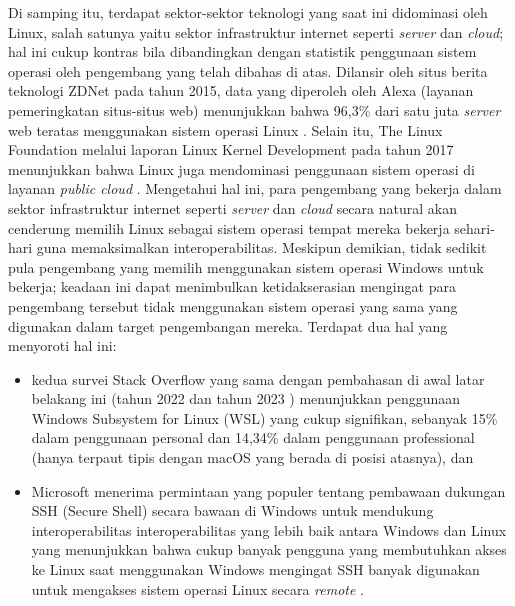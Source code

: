 Di samping itu, terdapat sektor-sektor teknologi yang saat ini didominasi oleh Linux, salah satunya yaitu sektor infrastruktur internet seperti \textit{server} dan \textit{cloud}; hal ini cukup kontras bila dibandingkan dengan statistik penggunaan sistem operasi oleh pengembang yang telah dibahas di atas. Dilansir oleh situs berita teknologi ZDNet pada tahun 2015, data yang diperoleh oleh Alexa (layanan pemeringkatan situs-situs web) menunjukkan bahwa 96,3\% dari satu juta \textit{server} web teratas menggunakan sistem operasi Linux \cite{zdnet-alexa-website-ranking-linux-dominance}. Selain itu, The Linux Foundation melalui laporan Linux Kernel Development pada tahun 2017 menunjukkan bahwa Linux juga mendominasi penggunaan sistem operasi di layanan \textit{public cloud} \cite{linux-dominance-on-public-cloud}. Mengetahui hal ini, para pengembang yang bekerja dalam sektor infrastruktur internet seperti \textit{server} dan \textit{cloud} secara natural akan cenderung memilih Linux sebagai sistem operasi tempat mereka bekerja sehari-hari guna memaksimalkan interoperabilitas. Meskipun demikian, tidak sedikit pula pengembang yang memilih menggunakan sistem operasi Windows untuk bekerja; keadaan ini dapat menimbulkan ketidakserasian mengingat para pengembang tersebut tidak menggunakan sistem operasi yang sama yang digunakan dalam target pengembangan mereka. Terdapat dua hal yang menyoroti hal ini:
\begin{itemize}
    \item kedua survei Stack Overflow yang sama dengan pembahasan di awal latar belakang ini (tahun 2022 \cite{stackoverflow-developer-survey-2022-most-popular-os} dan tahun 2023 \cite{stackoverflow-developer-survey-2023-most-popular-os}) menunjukkan penggunaan Windows Subsystem for Linux (WSL) yang cukup signifikan, sebanyak 15\% dalam penggunaan personal dan 14,34\% dalam penggunaan professional (hanya terpaut tipis dengan macOS yang berada di posisi atasnya), dan
    \item Microsoft menerima permintaan yang populer tentang pembawaan dukungan SSH (Secure Shell) secara bawaan di Windows untuk mendukung interoperabilitas interoperabilitas yang lebih baik antara Windows dan Linux yang menunjukkan bahwa cukup banyak pengguna yang membutuhkan akses ke Linux saat menggunakan Windows mengingat SSH banyak digunakan untuk mengakses sistem operasi Linux secara \textit{remote} \cite{microsoft-devblogs-ssh-support}.
\end{itemize}

